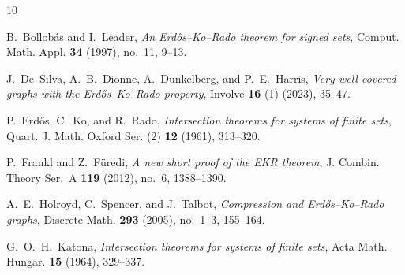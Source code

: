 \documentclass{article}
\theoremstyle{definition}
\newcommand{\1}{\mathbf{1}}
\begin{document}
\begin{thebibliography}{10}

B.~Bollob\'as and I.~Leader,
\emph{An Erd\H{o}s--Ko--Rado theorem for signed sets},
Comput. Math. Appl. \textbf{34} (1997), no.~11, 9--13.

J.~De~Silva, A.~B.~Dionne, A.~Dunkelberg, and P.~E.~Harris,
\emph{Very well-covered graphs with the Erd{\H{o}}s--Ko--Rado property},
Involve \textbf{16} (1) (2023), 35--47.

P.~Erd\H{o}s, C.~Ko, and R.~Rado,
\emph{Intersection theorems for systems of finite sets},
Quart. J. Math. Oxford Ser. (2) \textbf{12} (1961), 313--320.

P.~Frankl and Z.~F\"uredi,
\emph{A new short proof of the EKR theorem},
J. Combin. Theory Ser.~A \textbf{119} (2012), no.~6, 1388--1390.

A.~E.~Holroyd, C.~Spencer, and J.~Talbot,
\emph{Compression and Erd\H{o}s--Ko--Rado graphs},
Discrete Math. \textbf{293} (2005), no.~1--3, 155--164.

G.~O.~H.~Katona,
\emph{Intersection theorems for systems of finite sets},
Acta Math. Hungar. \textbf{15} (1964), 329--337.

\end{thebibliography}
\end{document}

